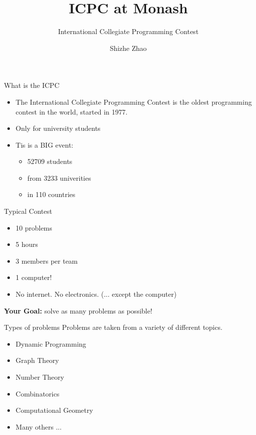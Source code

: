 \documentclass{beamer}
\title[ICPC at Monash]{ICPC at Monash}
\subtitle {International Collegiate Programming Contest}
\date{}
\author[Shizhe Zhao]{
  Shizhe Zhao
}
\begin{document}

\frame{\titlepage}

\begin{frame}{What is the ICPC}
  \begin{itemize}
    \item The {\color{red}\Large I}nternational 
              {\color{red}\Large C}ollegiate 
              {\color{red}\Large P}rogramming 
              {\color{red}\Large C}ontest is the oldest programming contest in the world, started in 1977.
    \item Only for university students
    \item Tis is a BIG event:
      \begin{itemize}
        \item 52709 students
        \item from 3233 univerities
        \item in 110 countries
      \end{itemize}
  \end{itemize}
\end{frame}

\begin{frame}{Typical Contest}
  \begin{itemize}
    \item 10 problems
    \item 5 hours
    \item 3 members per team
    \item 1 computer!
    \item No internet. No electronics. (... except the computer)
  \end{itemize}
  \begin{center}
  \LARGE{\textbf{Your Goal:}} solve as many problems as possible!
  \end{center}
\end{frame}

\begin{frame}{Types of problems}
  Problems are taken from a variety of different topics.
  \begin{itemize}
    \item Dynamic Programming
    \item Graph Theory
    \item Number Theory
    \item Combinatorics
    \item Computational Geometry
    \item Many others ...
  \end{itemize}
\end{frame}
\end{document}
